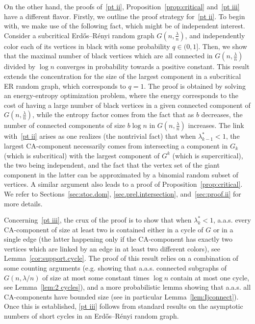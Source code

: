 \documentclass[AHL,Unicode,longabstracts,published]{cedram}
\begin{document}
On the other hand, the proofs of~\eqref{pt ii}, Proposition~\ref{prop:critical} and~\eqref{pt iii} have a different flavor. Firstly, we outline the proof strategy for~\eqref{pt ii}. To begin with, we make use of the following fact, which might be of independent interest. Consider a subcritical Erd\H{o}s--Rényi random graph $G(n,\frac{\lambda}{n})$, and independently color each of its vertices in black with some probability $q\in (0,1]$. Then, we show that the maximal number of black vertices which are all connected in $G(n,\frac{\lambda}{n})$ divided by $\log n$ converges in probability towards a positive constant. This result extends the concentration for the size of the largest component in a subcritical ER random graph, which corresponds to $q=1$. The proof is obtained by solving an energy-entropy optimization problem, where the energy corresponds to the cost of having a large number of black vertices in a given connected component of $G(n,\frac{\lambda}{n})$, while the entropy factor comes from the fact that as $b$ decreases, the number of connected components of size $b\log n$ in $G(n,\frac{\lambda}{n})$ increases. The link with~\eqref{pt ii} arises as one realizes (the nontrivial fact) that when $\lambda_{k-1}^*<1$, the largest CA-component necessarily comes from intersecting a component in $G_k$ (which is subcritical) with the largest component of $G^k$ (which is supercritical), the two being independent, and the fact that the vertex set of the giant component in the latter can be approximated by a binomial random subset of vertices. A similar argument also leads to a proof of Proposition~\ref{prop:critical}. We refer to Sections~\ref{sec:stoc.dom}, \ref{sec.prel.intersection}, and~\ref{sec:proof.ii} for more details.

Concerning~\eqref{pt iii}, the crux of the proof is to show that when $\lambda_k^*<1$, a.a.s. every CA-component of size at least two is contained either in a cycle of $G$ or in a single edge (the latter happening only if the CA-component has exactly two vertices which are linked by an edge in at least two different colors), see Lemma~\ref{cor:support.cycle}. The proof of this result relies on a combination of some counting arguments (e.g. showing that a.a.s. connected subgraphs of $G(n,\lambda/n)$ of size at most some constant times $\log n$ contain at most one cycle, see Lemma~\ref{lem:2 cycles}), and a more probabilistic lemma showing that a.a.s. all CA-components have bounded size (see in particular Lemma~\ref{lem:Ijconnect}). Once this is established, \eqref{pt iii} follows from standard results on the asymptotic numbers of short cycles in an Erd\H{o}s--Rényi random graph.
\end{document}
